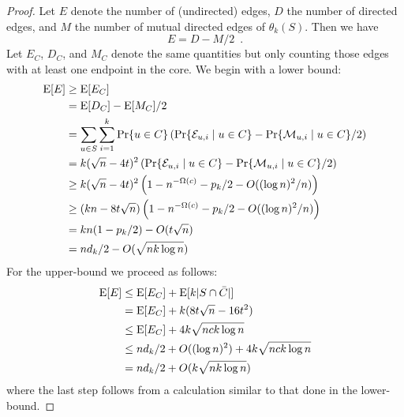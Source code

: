 \documentclass{patmorin}
\begin{document}
\begin{proof}
  Let $E$ denote the number of (undirected) edges, $D$
  the number of directed edges, and $M$ the number of mutual directed edges
  of $\theta_k(S)$.   Then we have
  \[  
     E = D - M/2 \enspace . 
  \]
  Let $E_C$, $D_C$, and $M_C$ denote the same quantities but only
  counting those edges with at least one endpoint in the core.
  We begin with a lower bound:
  \begin{align*}
   \mathrm{E}[E] & \ge \mathrm{E}[E_C] \\
         & = \mathrm{E}[D_C] - \mathrm{E}[M_C]/2 \\
         & = \sum_{u\in S}\sum_{i=1}^k\Pr\{u\in C\}
              \left(\Pr\{\mathcal{E}_{u,i}\mid u\in C\}
                - \Pr\{\mathcal{M}_{u,i}\mid u\in C\}/2 \right) \\
        & = k(\sqrt{n}-4t)^2
              \left(\Pr\{\mathcal{E}_{u,i}\mid u\in C\}
                - \Pr\{\mathcal{M}_{u,i}\mid u\in C\}/2 \right) \\
        & \ge k(\sqrt{n}-4t)^2
              \left(1-n^{-\Omega(c)} - p_k/2 - O((\log n)^2/n)\right) \\
        & \ge (kn - 8t\sqrt{n})
              \left(1-n^{-\Omega(c)} - p_k/2 - O((\log n)^2/n)\right) \\
        & = kn(1-p_k/2) - O(t\sqrt{n}) \\
        & = nd_k/2 - O(\sqrt{nk\log n})
  \end{align*} 
  For the upper-bound we proceed as follows:
  \begin{align*}
     \mathrm{E}[E] & \le \mathrm{E}[E_C] + \mathrm{E}[k|S\cap\bar{C}|] \\
           & = \mathrm{E}[E_C] + k(8t\sqrt{n}-16t^2) \\
           & \le \mathrm{E}[E_C] + 4k\sqrt{nck\log n} \\
           & \le nd_k/2 + O((\log n)^2) + 4k\sqrt{nck\log n} \\
           & = nd_k/2 + O(k\sqrt{nk\log n})
  \end{align*}
  where the last step follows from a calculation similar to that
  done in the lower-bound.
%
%
%
\end{proof}
\end{document}
